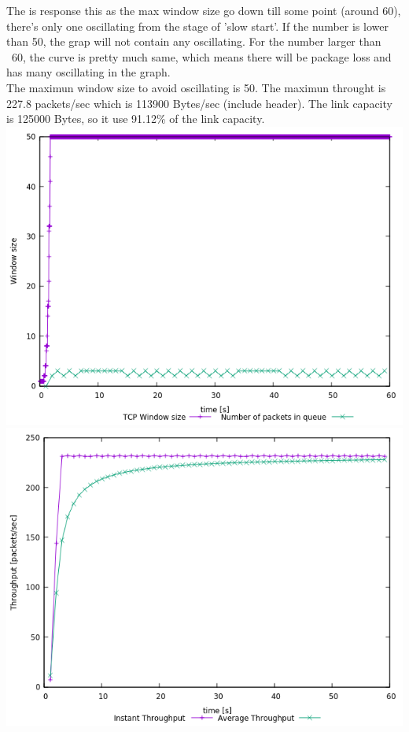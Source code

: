 \documentclass{article}
\begin{document}
The is response this as the max window size go down till some point (around 60), there's only one oscillating from the stage of 'slow start'. If the number is lower than 50, the grap will not contain any oscillating. For the number larger than ~60, the curve is pretty much same, which means there will be package loss and has many oscillating in the graph. \\
The maximun window size to avoid oscillating is 50. The maximun throught is 227.8 packets/sec which is 113900 Bytes/sec (include header). The link capacity is 125000 Bytes, so it use 91.12\% of the link capacity.\\
\includegraphics[width=\textwidth]{ex1q3-1.png}
\includegraphics[width=\textwidth]{ex1q3-2.png}
\end{document}
